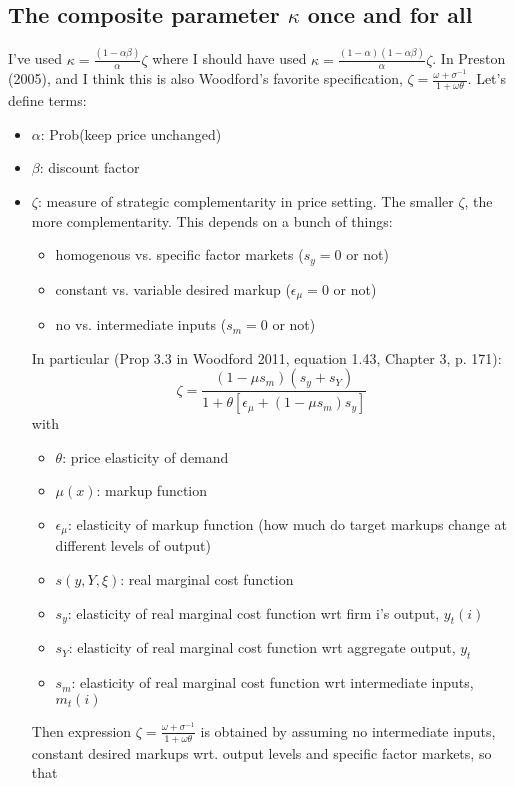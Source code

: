 \documentclass[11pt]{article}
\renewcommand{\[}{\begin{equation}}
\renewcommand{\]}{\end{equation}}
\begin{document}
\subsection{The composite parameter $\kappa$ once and for all}
I've used $\kappa = \frac{(1-\alpha\beta)}{\alpha} \zeta$ where I should have used $\kappa = \frac{(1-\alpha)(1-\alpha\beta)}{\alpha} \zeta$. In Preston (2005), and I think this is also Woodford's favorite specification, $\zeta = \frac{\omega + \sigma^{-1}}{1+\omega\theta}$.
Let's define terms:
\begin{itemize}
\item $\alpha$: Prob(keep price unchanged)
\item $\beta$: discount factor
\item $\zeta$: measure of strategic complementarity in price setting. The smaller $\zeta$, the more complementarity. This depends on a bunch of things:
	\begin{itemize}
	\item homogenous vs. specific factor markets ($s_y = 0$ or not)
	\item constant vs. variable desired markup ($\epsilon_{\mu}=0$ or not)
	\item no vs. intermediate inputs ($s_m = 0$ or not)
	\end{itemize}
	In particular (Prop 3.3 in Woodford 2011, equation 1.43, Chapter 3,  p. 171):
	\begin{equation}
	\zeta = \frac{(1-\mu s_m)(s_y + s_Y)}{1+\theta [\epsilon_{\mu}+(1-\mu s_m)s_y]}
	\end{equation}
with 
\begin{itemize}
\item $\theta$: price elasticity of demand
\item $\mu(x)$: markup function
\item $\epsilon_{\mu}$: elasticity of markup function (how much do target markups change at different levels of output)
\item $s(y,Y,\xi)$: real marginal cost function
\item $s_y$: elasticity of real marginal cost function wrt firm i's output, $y_t(i)$
\item $s_Y$: elasticity of real marginal cost function wrt aggregate output, $y_t$
\item $s_m$: elasticity of real marginal cost function wrt intermediate inputs, $m_t(i)$
\end{itemize}
Then expression $\zeta = \frac{\omega + \sigma^{-1}}{1+\omega\theta}$ is obtained by assuming no intermediate inputs, constant desired markups wrt. output levels and specific factor markets, so that

\end{itemize}
\end{document}
